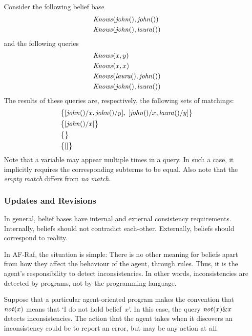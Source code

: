 \documentclass[a4paper,12pt,oneside,fleqn]{book} %
\newcommand{\todo}[1]{[\textcolor{red}{TODO}: #1]}
\begin{document}
{\begin{example} Consider the following belief base \begin{align} &{\it
Knows}({\it john}(), {\it john}()) \\ &{\it Knows}({\it john}(), {\it
laura}()) \end{align} and the following queries \begin{align} &{\it
Knows}(x, y) \\ &{\it Knows}(x, x) \\ &{\it Knows}({\it laura}(), {\it
john}()) \\ &{\it Knows}({\it john}(), {\it laura}()) \end{align} The
results of these queries are, respectively, the following sets of
matchings: \begin{align} &\bigl\{ [{\it john}()/x, {\it john}()/y],\; [{\it
john}()/x,{\it laura}()/y] \bigr\} \\ &\bigl\{ [{\it john}()/x] \bigr\} \\
&\bigl\{\bigr\} \\ &\bigl\{[]\bigr\} \end{align} Note that a variable may
appear multiple times in a query.  In such a case, it implicitly requires
the corresponding subterms to be equal.  Also note that the \emph{empty
match} differs from \emph{no match}.
\end{example}


\subsubsection{Updates and Revisions}

In general, belief bases have internal and external consistency
requirements.  Internally, beliefs should not contradict each-other.
Externally, beliefs should correspond to reality.

In AF-Raf, the situation is simple: There is no other meaning for beliefs
apart from how they affect the behaviour of the agent, through rules.
Thus, it is the agent's responsibility to detect inconsistencies.  In other
words, inconsistencies are detected by programs, not by the programming
language.

\begin{example} Suppose that a particular agent-oriented program makes the
convention that ${\it not}(x)$ means that `I do not hold belief~$x$'.  In
this case, the query ${\it not}(x)\&x$ detects inconsistencies.  The action
that the agent takes when it discovers an inconsistency could be to report
an error, but may be any action at all.  \end{example}

}
\end{document}
